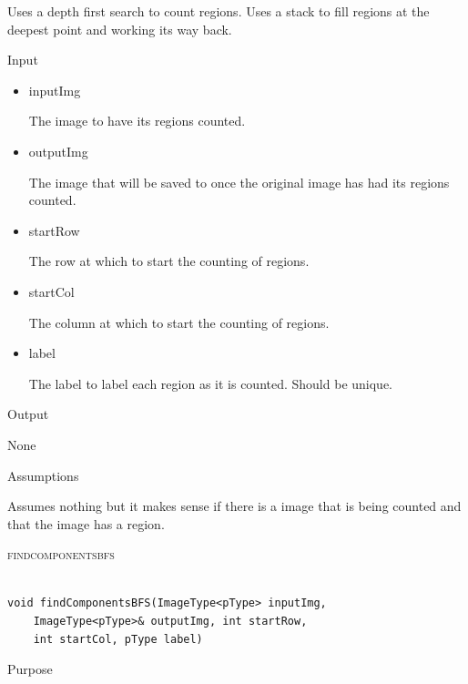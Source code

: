 \documentclass[pdftex, 11pt]{article}
\begin{document}
\begin{description}
\begin{description}
				Uses a depth first search to count regions. Uses
				a stack to fill regions at the deepest point and
				working its way back.

			\item{Input}

				\begin{itemize}

					\item{inputImg}

						The image to have its regions
						counted.

					\item{outputImg}

						The image that will be saved to
						once the original image has had
						its regions counted.

					\item{startRow}

						The row at which to start the
						counting of regions.

					\item{startCol}

						The column at which to start the
						counting of regions.

					\item{label}

						The label to label each region
						as it is counted. Should be
						unique.

				\end{itemize}

			\item{Output}

				None

			\item{Assumptions}

				Assumes nothing but it makes sense if there is a
				image that is being counted and that the image
				has a region.


		\end{description}
	\item{\textsc{findcomponentsbfs}}

		\begin{lstlisting}

void findComponentsBFS(ImageType<pType> inputImg,
	ImageType<pType>& outputImg, int startRow,
	int startCol, pType label)
		\end{lstlisting}

		\begin{description}
			\item{Purpose}


\end{description}
\end{description}
\end{document}
